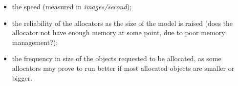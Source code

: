 \documentclass[12pt,twoside]{article}
\begin{document}



\begin{itemize}
\vspace{-10px}
\itemsep-0.25em 
\item the speed (measured in \textit{images/second});
\item the reliability of the allocators as the size of the model is raised (does the allocator not have enough memory at some point, due to poor memory management?);
\item the frequency in size of the objects requested to be allocated, as some allocators may prove to run better if most allocated objects are smaller or bigger.
\vspace{-10px}
\end{itemize}


\end{document}
